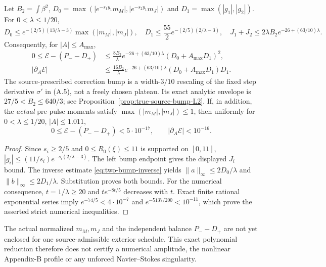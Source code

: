 \begin{proposition}
\label{prop:A19-error-budget}
Let $B_2=\int\beta^2$, $D_0=\max(|e^{-s_1y_1}m_M|,
|e^{-s_2y_1}m_J|)$ and $D_1=\max(|g_1|,|g_2|)$.
For $0<\lambda\le1/20$,
\[
D_0\le e^{-(2/5)(13/\lambda-3)}\max(|m_M|,|m_J|),\quad
D_1\le\frac{55}{2}e^{-(2/5)(2/\lambda-3)},\quad
J_1+J_2\le2\lambda B_2 e^{-26+(63/10)\lambda}.
\]
Consequently, for $|A|\le A_{\max}$,
\begin{align*}
0\le\mathcal E-(P_--D_+)&\le
\frac{8B_2}{\lambda}e^{-26+(63/10)\lambda}
(D_0+A_{\max}D_1)^2,\\
|\partial_A\mathcal E|&\le
\frac{16B_2}{\lambda}e^{-26+(63/10)\lambda}
(D_0+A_{\max}D_1)D_1.
\end{align*}
The source-prescribed correction bump is a width-$3/10$ rescaling
of the fixed step derivative $\sigma'$ in (A.5), not a freely chosen
plateau. Its exact analytic envelope is $27/5<B_2\le640/3$;
see Proposition~\ref{prop:true-source-bump-L2}.
If, in addition, the \emph{actual} pre-pulse moments satisfy
$\max(|m_M|,|m_J|)\le1$, then uniformly for
$0<\lambda\le1/20$, $|A|\le1.011$,
\[
0\le\mathcal E-(P_--D_+)<5\cdot10^{-17},
\qquad |\partial_A\mathcal E|<10^{-16}.
\]
\end{proposition}
\begin{proof}
Since $s_i\ge2/5$ and $0\le R_0(\xi)\le11$ is supported
on $[0,11]$,
$|g_i|\le(11/s_i)e^{-s_i(2/\lambda-3)}$.
The left bump endpoint gives the displayed $J_i$ bound.
The inverse estimate \eqref{eq:two-bump-inverse} yields
$\|a\|_\infty\le2D_0/\lambda$ and
$\|b\|_\infty\le2D_1/\lambda$. Substitution proves both bounds.
For the numerical consequence, $t=1/\lambda\ge20$ and
$t e^{-8t/5}$ decreases with $t$. Exact finite rational
exponential series imply $e^{-74/5}<4\cdot10^{-7}$ and
$e^{-5137/200}<10^{-11}$, which prove the asserted
strict numerical inequalities.
\end{proof}

The actual normalized $m_M,m_J$ and the independent balance
$P_--D_+$ are not yet enclosed for one source-admissible
exterior schedule. This exact polynomial reduction therefore
does not certify a numerical amplitude, the nonlinear
Appendix-B profile or any unforced Navier--Stokes singularity.
